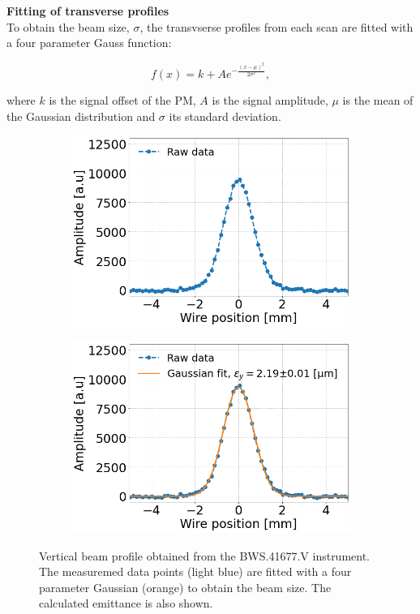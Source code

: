 \normalsize{\textbf{Fitting of transverse profiles}}\\
To obtain the beam size, $\sigma$, the transvserse profiles from each scan are fitted with a four parameter Gauss function:

\begin{equation}\label{eq:4p_gauss}
   f(x) = k + A e^{-\frac{(x-\mu)^2}{2 \sigma^2}},
\end{equation}

where $k$ is the signal offset of the PM, $A$ is the signal amplitude, $\mu$ is the mean of the Gaussian distribution and $\sigma$ its standard deviation.


\begin{figure}[!h]
   \centering
   \begin{subfigure}{.5\textwidth}
     \centering
     \includegraphics[width=1.0\linewidth]{images/Ch4/SPS.BWS.41677.V_ROT_2018-09-05 15_45_01.33500_raw.png}
   \end{subfigure}%
   \begin{subfigure}{.5\textwidth}
     \centering
     \includegraphics[width=1.0\linewidth]{images/Ch4/SPS.BWS.41677.V_ROT_2018-09-05 15_45_01.33500_raw_and_fit.png}
   \end{subfigure}
   \caption{ Vertical beam profile obtained from the BWS.41677.V instrument. The measuremed data points (light blue) are fitted with a four parameter Gaussian (orange) to obtain the beam size. The calculated emittance is also shown.}
   \label{fig:WS_example_V_profile}
\end{figure}

